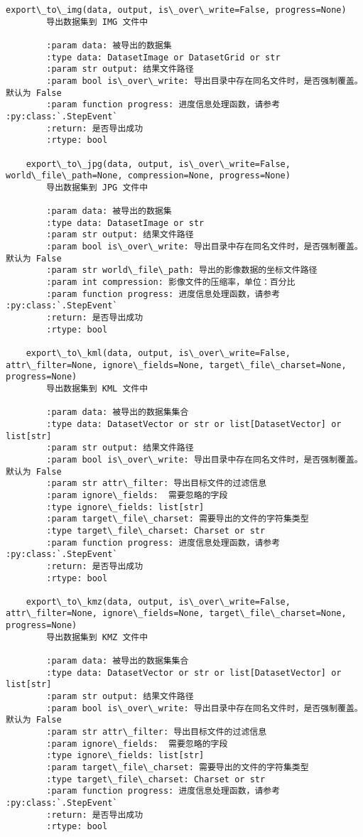 \documentclass[11pt]{article}
\begin{document}
\begin{Verbatim}[commandchars=\\\{\}]
    export\_to\_img(data, output, is\_over\_write=False, progress=None)
        导出数据集到 IMG 文件中
        
        :param data: 被导出的数据集
        :type data: DatasetImage or DatasetGrid or str
        :param str output: 结果文件路径
        :param bool is\_over\_write: 导出目录中存在同名文件时，是否强制覆盖。默认为 False
        :param function progress: 进度信息处理函数，请参考 :py:class:`.StepEvent`
        :return: 是否导出成功
        :rtype: bool
    
    export\_to\_jpg(data, output, is\_over\_write=False, world\_file\_path=None, compression=None, progress=None)
        导出数据集到 JPG 文件中
        
        :param data: 被导出的数据集
        :type data: DatasetImage or str
        :param str output: 结果文件路径
        :param bool is\_over\_write: 导出目录中存在同名文件时，是否强制覆盖。默认为 False
        :param str world\_file\_path: 导出的影像数据的坐标文件路径
        :param int compression: 影像文件的压缩率，单位：百分比
        :param function progress: 进度信息处理函数，请参考 :py:class:`.StepEvent`
        :return: 是否导出成功
        :rtype: bool
    
    export\_to\_kml(data, output, is\_over\_write=False, attr\_filter=None, ignore\_fields=None, target\_file\_charset=None, progress=None)
        导出数据集到 KML 文件中
        
        :param data: 被导出的数据集集合
        :type data: DatasetVector or str or list[DatasetVector] or list[str]
        :param str output: 结果文件路径
        :param bool is\_over\_write: 导出目录中存在同名文件时，是否强制覆盖。默认为 False
        :param str attr\_filter: 导出目标文件的过滤信息
        :param ignore\_fields:  需要忽略的字段
        :type ignore\_fields: list[str]
        :param target\_file\_charset: 需要导出的文件的字符集类型
        :type target\_file\_charset: Charset or str
        :param function progress: 进度信息处理函数，请参考 :py:class:`.StepEvent`
        :return: 是否导出成功
        :rtype: bool
    
    export\_to\_kmz(data, output, is\_over\_write=False, attr\_filter=None, ignore\_fields=None, target\_file\_charset=None, progress=None)
        导出数据集到 KMZ 文件中
        
        :param data: 被导出的数据集集合
        :type data: DatasetVector or str or list[DatasetVector] or list[str]
        :param str output: 结果文件路径
        :param bool is\_over\_write: 导出目录中存在同名文件时，是否强制覆盖。默认为 False
        :param str attr\_filter: 导出目标文件的过滤信息
        :param ignore\_fields:  需要忽略的字段
        :type ignore\_fields: list[str]
        :param target\_file\_charset: 需要导出的文件的字符集类型
        :type target\_file\_charset: Charset or str
        :param function progress: 进度信息处理函数，请参考 :py:class:`.StepEvent`
        :return: 是否导出成功
        :rtype: bool
    

\end{Verbatim}
\end{document}
